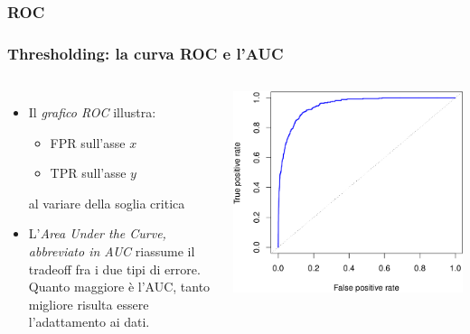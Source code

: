 \subsubsection[ROC]{ROC}
\begin{frame}
	\frametitle{Thresholding: la curva ROC e l'AUC}
	
	\begin{columns}
		\begin{itemize}
			\item Il \emph{grafico ROC} illustra:
			\begin{itemize}
				\item FPR sull'asse $x$		
				\item TPR sull'asse $y$
			\end{itemize}
			al variare della soglia critica
		
			\item L'\emph{Area Under the Curve, abbreviato in AUC} riassume il tradeoff fra i due tipi di errore.\\
				Quanto maggiore è l'AUC, tanto migliore risulta essere l'adattamento ai dati.
		\end{itemize}
			
		\begin{center}
			\includegraphics[width=1.0\linewidth]{images/supervised/z_algoritms_logistic_thresholding/roc.png}
		\end{center}			
	\end{columns}
	
\end{frame}


